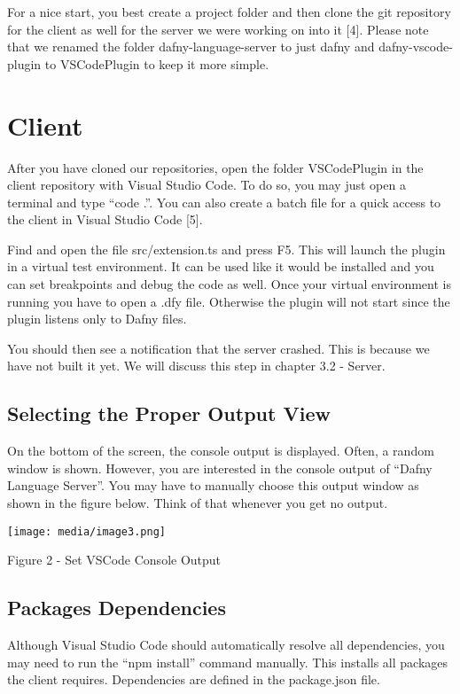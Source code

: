 \documentclass[]{book}
\begin{document}
For a nice start, you best create a project folder and then clone the git repository for the client as well for the server we were working on into it {[}4{]}. Please note that we renamed the folder dafny-language-server to just dafny and dafny-vscode-plugin to VSCodePlugin to keep it more simple.

\section{Client}\label{client}

After you have cloned our repositories, open the folder VSCodePlugin in the client repository with Visual Studio Code. To do so, you may just open a terminal and type ``code .''. You can also create a batch file for a quick access to the client in Visual Studio Code {[}5{]}.

Find and open the file src/extension.ts and press F5. This will launch the plugin in a virtual test environment. It can be used like it would be installed and you can set breakpoints and debug the code as well. Once your virtual environment is running you have to open a .dfy file. Otherwise the plugin will not start since the plugin listens only to Dafny files.

You should then see a notification that the server crashed. This is because we have not built it yet. We will discuss this step in chapter 3.2 - Server.

\subsection{Selecting the Proper Output View}\label{selecting-the-proper-output-view}

On the bottom of the screen, the console output is displayed. Often, a random window is shown. However, you are interested in the console output of ``Dafny Language Server''. You may have to manually choose this output window as shown in the figure below. Think of that whenever you get no output.

\texttt{[image: media/image3.png]}

Figure 2 - Set VSCode Console Output

\subsection{Packages Dependencies}\label{packages-dependencies}

Although Visual Studio Code should automatically resolve all dependencies, you may need to run the ``npm install'' command manually. This installs all packages the client requires. Dependencies are defined in the package.json file.
\end{document}
